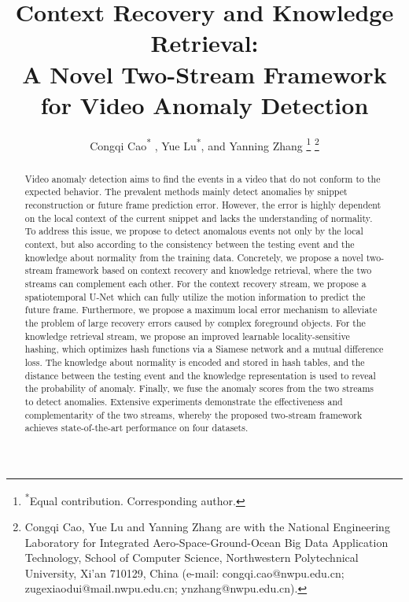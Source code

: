 \documentclass[lettersize,journal]{IEEEtran}
\begin{document}
\title{Context Recovery and Knowledge Retrieval: \\A Novel Two-Stream Framework \\for Video Anomaly Detection}

\author{Congqi Cao\textsuperscript{* \textdagger}, Yue Lu\textsuperscript{*}, and Yanning Zhang
	\thanks{\textsuperscript{*}Equal contribution. \textsuperscript{\textdagger}Corresponding author.}
	\thanks{Congqi Cao, Yue Lu and Yanning Zhang are with the National Engineering Laboratory for Integrated Aero-Space-Ground-Ocean Big Data Application Technology, School of Computer Science, Northwestern Polytechnical University, Xi'an 710129, China (e-mail: congqi.cao@nwpu.edu.cn; zugexiaodui@mail.nwpu.edu.cn; ynzhang@nwpu.edu.cn).}
}




\maketitle

\begin{abstract}

Video anomaly detection aims to find the events in a video that do not conform to the expected behavior.
The prevalent methods mainly detect anomalies by snippet reconstruction or future frame prediction error.
However, the error is highly dependent on the local context of the current snippet and lacks the understanding of normality.
To address this issue, we propose to detect anomalous events not only by the local context, but also according to the consistency between the testing event and the knowledge about normality from the training data.
Concretely, we propose a novel two-stream framework based on context recovery and knowledge retrieval, where the two streams can complement each other.
For the context recovery stream, we propose a spatiotemporal U-Net which can fully utilize the motion information to predict the future frame.
Furthermore, we propose a maximum local error mechanism to alleviate the problem of large recovery errors caused by complex foreground objects.
For the knowledge retrieval stream, we propose an improved learnable locality-sensitive hashing, which optimizes hash functions via a Siamese network and a mutual difference loss.
The knowledge about normality is encoded and stored in hash tables, and the distance between the testing event and the knowledge representation is used to reveal the probability of anomaly.
Finally, we fuse the anomaly scores from the two streams to detect anomalies.
Extensive experiments demonstrate the effectiveness and complementarity of the two streams, whereby the proposed two-stream framework achieves state-of-the-art performance on four datasets.


\end{abstract}
\end{document}
